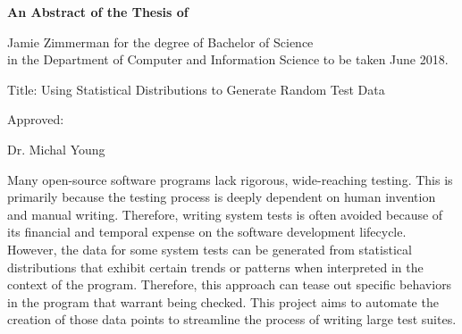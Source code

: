 
\begin{center}

\normalsize \textbf {An Abstract of the Thesis of}

Jamie Zimmerman for the degree of Bachelor of Science \\
in the Department of Computer and Information Science to be taken June 2018.

\vspace{2cm}


Title: Using Statistical Distributions to Generate Random Test Data

\vspace{1.5cm}

Approved: \hrulefill

Dr. Michal Young

\vspace{1cm}

\end{center}
\setlength{\parindent}{0.5cm}
\indent\indent Many open-source software programs lack rigorous, wide-reaching testing. This is primarily because the testing process is deeply dependent on human invention and manual writing. Therefore, writing system tests is often avoided because of its financial and temporal expense on the software development lifecycle. However, the data for some system tests can be generated from statistical distributions that exhibit certain trends or patterns when interpreted in the context of the program. Therefore, this approach can tease out specific behaviors in the program that warrant being checked. This project aims to automate the creation of those data points to streamline the process of writing large test suites.
